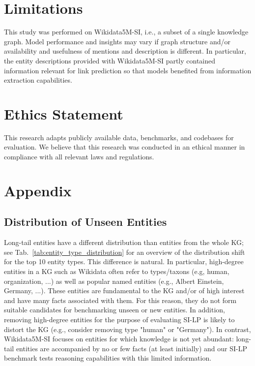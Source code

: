 \documentclass[11pt]{article}
\renewcommand\:{\colon} \newcommand{\sset}[1]{\left\{\,#1\,\right\}} \newcommand{\ssets}[1]{\left\{#1\right\}} \newcommand{\ssetn}[1]{\{\,#1\,\}}
\begin{document}
\section*{Limitations}

This study was performed on Wikidata5M-SI, i.e., a subset of a single knowledge
graph. Model performance and insights may vary if graph structure and/or
availability and usefulness of mentions and description is different. In particular, the entity descriptions provided with Wikidata5M-SI partly contained
information relevant for link prediction so that models benefited from information extraction capabilities.




\section*{Ethics Statement}
This research adapts publicly available data, benchmarks, and codebases for evaluation.
We believe that this research was conducted in an ethical manner in compliance with all relevant laws and regulations.





\appendix

\section{Appendix}
\label{sec:appendix}





\subsection{Distribution of Unseen Entities}
\label{sec:entity_type_bias}

Long-tail entities have a different distribution than entities from the whole
KG; see Tab.~\ref{tab:entity_type_distribution} for an overview of the
distribution shift for the top 10 entity types. This difference is
natural. In particular, high-degree entities in a KG such as Wikidata often
refer to types/taxons (e.g, human, organization, ...) as well as popular named
entities (e.g., Albert Einstein, Germany, ...). These entities are fundamental
to the KG and/or of high interest and have many facts associated with them. For
this reason, they do not form suitable candidates for benchmarking unseen or new
entities. In addition, removing high-degree entities for the purpose of
evaluating SI-LP is likely to distort the KG (e.g., consider removing type
"human" or "Germany"). In contrast, Wikidata5M-SI focuses on entities for which
knowledge is not yet abundant: long-tail entities are accompanied by no or few
facts (at least initially) and our SI-LP benchmark tests reasoning capabilities
with this limited information.
\end{document}
